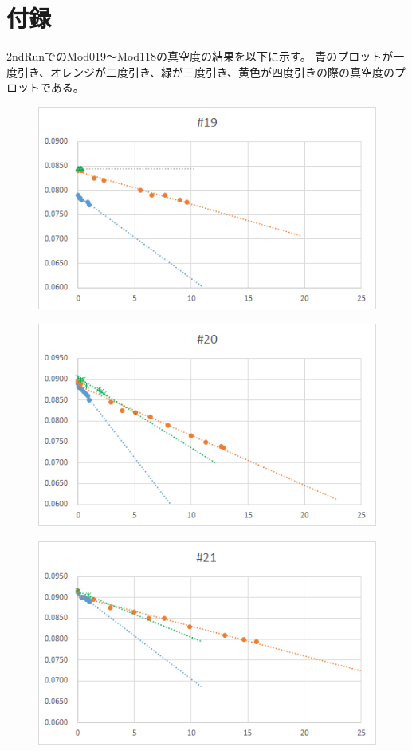 \documentclass[12pt,a4paper]{jarticle}
\begin{document}
\section*{付録}
2ndRunでのMod019〜Mod118の真空度の結果を以下に⽰す。 
青のプロットが一度引き、オレンジが二度引き、緑が三度引き、黄色が四度引きの際の真空度のプロットである。
\begin{figure}[htbp]
  \centering
     \includegraphics[width=120mm]{vol_019.png}
\end{figure}
\begin{figure}[htbp]
  \centering
     \includegraphics[width=120mm]{vol_020.png}
\end{figure}
\begin{figure}[htbp]
  \centering
     \includegraphics[width=120mm]{vol_021.png}
\end{figure}
\end{document}
